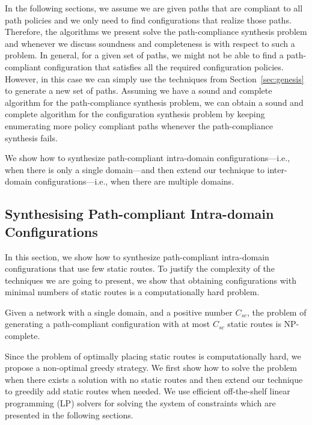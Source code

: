 In the following sections, we assume we are given paths that are compliant to 
all path policies and we only need to find configurations that realize those paths.
Therefore, the algorithms we present solve the path-compliance synthesis problem
and whenever we discuss soundness and completeness is with respect to such a problem.
In general, for a given set of paths, we might not be able to find a path-compliant configuration
that satisfies all the required configuration policies. However, in this case
we can simply use the techniques from Section~\ref{sec:genesis} to generate
a new set of paths.
Assuming we have a sound and complete algorithm for the
path-compliance synthesis problem, we can obtain a sound and complete algorithm
for the
 configuration synthesis problem by keeping enumerating more policy compliant paths
 whenever the path-compliance synthesis fails.

We show how to synthesize 
path-compliant intra-domain 
configurations---i.e., when there
is only a single domain---and then extend our technique to
 inter-domain configurations---i.e., when
there are multiple domains.



\subsection{Synthesising Path-compliant Intra-domain Configurations} \label{sec:intra-synthesis}
In this section, we show how to synthesize  path-compliant  intra-domain configurations that
use few static routes.
To justify the complexity of the techniques 
we are going to present,
we show that
obtaining configurations with minimal numbers of static routes is a 
computationally hard problem.
\begin{theorem}
\label{thm:ospfsynth}
Given a
network with a single domain,
and a positive number $C_{sc}$,
the problem of generating
a path-compliant configuration with at most $C_{sc}$ static routes
is NP-complete.
\end{theorem}
\iffull

\fi
Since the problem of optimally placing 
static routes is computationally hard, 
we propose a non-optimal greedy strategy.
We first show how to solve the problem when 
there exists a solution with no static routes
and then extend our technique to greedily 
add static routes when needed. We use 
efficient off-the-shelf linear programming (LP) 
solvers for solving the system of constraints 
which are presented in the following sections. 
			
